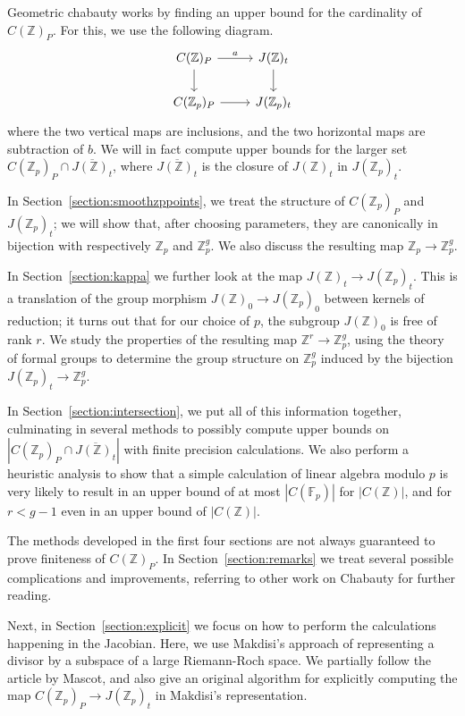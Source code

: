 \documentclass[12pt]{article}
\newcommand{\Z}{\mathbb{Z}}
\newcommand{\F}{\mathbb{F}}
\theoremstyle{plain}
\theoremstyle{definition}
\theoremstyle{remark}
\begin{document}
Geometric chabauty works by finding an upper bound for the cardinality of $C(\Z)_P$. For this, we use the following diagram.
\[
\begin{tikzcd}
C(\Z)_P \arrow[d] \arrow[r, "a"] & J(\Z)_t \arrow[d] \\
C(\Z_p)_P \arrow[r]              & J(\Z_p)_t        
\end{tikzcd}
\]
where the two vertical maps are inclusions, and the two horizontal maps are subtraction of $b$. We will in fact compute upper bounds for the larger set $C(\Z_p)_P \cap \overline{J(\Z)_t}$, where $\overline{J(\Z)_t}$ is the closure of $J(\Z)_t$ in $J(\Z_p)_t$. 

In Section~\ref{section:smoothzppoints}, we treat the structure of $C(\Z_p)_P$ and $J(\Z_p)_t$; we will show that, after choosing parameters, they are canonically in bijection with respectively $\Z_p$ and $\Z_p^g$. We also discuss the resulting map $\Z_p \to \Z_p^g$.

In Section~\ref{section:kappa} we further look at the map $J(\Z)_t \to J(\Z_p)_t$. This is a translation of the group morphism $J(\Z)_0 \to J(\Z_p)_0$ between kernels of reduction; it turns out that for our choice of $p$, the subgroup $J(\Z)_0$ is free of rank $r$. We study the properties of the resulting map $\Z^r \to \Z_p^g$, using the theory of formal groups to determine the group structure on $\Z_p^g$ induced by the bijection $J(\Z_p)_t \to \Z_p^g$.

In Section~\ref{section:intersection}, we put all of this information together, culminating in several methods to possibly compute upper bounds on $\left|C(\Z_p)_P \cap \overline{J(\Z)_t}\right|$ with finite precision calculations. We also perform a heuristic analysis to show that a simple calculation of linear algebra modulo $p$ is very likely to result in an upper bound of at most $|C(\F_p)|$ for $|C(\Z)|$, and for $r < g-1$ even in an upper bound of $|C(\Z)|$.

The methods developed in the first four sections are not always guaranteed to prove finiteness of $C(\Z)_P$. In Section~\ref{section:remarks} we treat several possible complications and improvements, referring to other work on Chabauty for further reading.

Next, in Section~\ref{section:explicit} we focus on how to perform the calculations happening in the Jacobian. Here, we use Makdisi's approach of representing a divisor by a subspace of a large Riemann-Roch space. We partially follow the article \citep{mascot18} by Mascot, and also give an original algorithm for explicitly computing the map $C(\Z_p)_P \to J(\Z_p)_t$ in Makdisi's representation.
\end{document}
